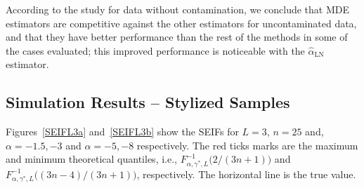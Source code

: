 \documentclass[twocolumn]{svjour3}
\begin{document}
	
	According to the study for data without contamination, we conclude that MDE estimators are competitive against the other estimators for uncontaminated data, and that they have better performance than the rest of the methods in some of the cases evaluated; this improved performance is noticeable with the $\widehat{\alpha}_{\text{{LN}}}$ estimator.
	
	\subsection{Simulation Results -- Stylized Samples}
	\label{StylizedSamples}
	
	Figures~\ref{SEIFL3a} and~\ref{SEIFL3b} show the SEIFs for $L=3$, $n=25$ and, $\alpha=-1.5,-3$ and $\alpha=-5,-8$ respectively. 
	The red ticks marks are the maximum and minimum theoretical quantiles, i.e., $F^{-1}_{\alpha,\gamma^*,L}\big(2/(3n+1)\big)$ and $F^{-1}_{\alpha,\gamma^*,L}\big((3n-4)/(3n+1)\big)$, respectively.
	The horizontal line is the true value.
	
\end{document}
